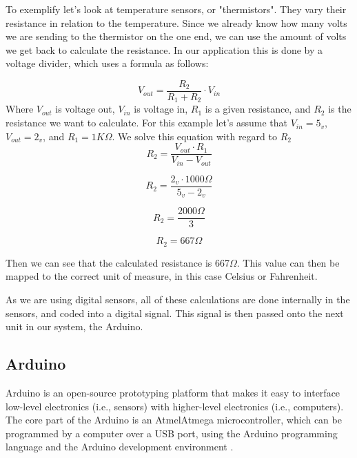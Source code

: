 To exemplify let's look at temperature sensors, or "thermistors". They vary their resistance in relation to the temperature. Since we already know how many volts we are sending to the thermistor on the one end, we can use the amount of volts we get back to calculate the resistance. In our application this is done by a voltage divider, which uses a formula as follows: 

\begin{equation}
V_{out}=\frac{R_{2}}{R_{1}+R_{2}}\cdot V_{in} 
\label{eq:vdiv1}
\end{equation}
Where $V_{out}$ is voltage out, $V_{in}$ is voltage in, $R_{1}$ is a given resistance, and $R_{2}$ is the resistance we want to calculate. For this example let's assume that $V_{in} = 5_{v}$, $V_{out} = 2_{v}$, and $R_{1} = 1K\Omega$. We solve this equation with regard to $R_{2}$
\begin{equation}
R_{2} = \frac{V_{out} \cdot R_{1}}{V_{in}-V_{out}}
\end{equation} 

\begin{equation}
R_{2} = \frac{2_{v} \cdot 1000\Omega}{5_{v}-2_{v}}
\end{equation} 

\begin{equation}
R_{2} = \frac{2000\Omega}{3}
\end{equation} 

\begin{equation}
R_{2} = 667\Omega
\end{equation} 

Then we can see that the calculated resistance is 667$\Omega$. This value can then be mapped to the correct unit of measure, in this case Celsius or Fahrenheit. 

As we are using digital sensors, all of these calculations are done internally in the sensors, and coded into a digital signal. This signal is then passed onto the next unit in our system, the Arduino.  

\subsection{Arduino}

Arduino is an open-source prototyping platform that makes it easy to interface low-level electronics (i.e., sensors) with higher-level electronics (i.e., computers). The core part of the Arduino is an Atmel\texttrademark Atmega microcontroller, which can be programmed by a computer over a USB port, using the Arduino programming language and the Arduino development environment \citep{Arduino}.

